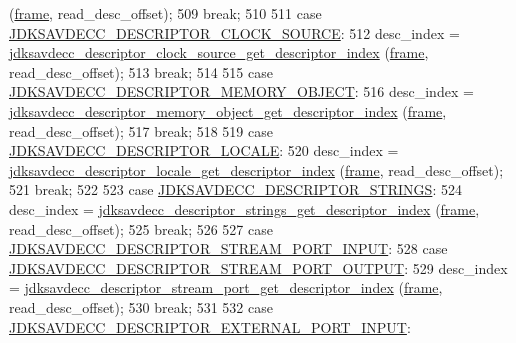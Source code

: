 \begin{DoxyCode}
      (\hyperlink{gst__avb__playbin_8c_ac8e710e0b5e994c0545d75d69868c6f0}{frame}, read\_desc\_offset);
509         \textcolor{keywordflow}{break};
510 
511     \textcolor{keywordflow}{case} \hyperlink{group__descriptor_gae8b9beae540ce53a6111a848a97ae748}{JDKSAVDECC\_DESCRIPTOR\_CLOCK\_SOURCE}:
512         desc\_index = \hyperlink{group__descriptor__clock__source_ga5b543a9b01054f53161de607189cacb7}{jdksavdecc\_descriptor\_clock\_source\_get\_descriptor\_index}
      (\hyperlink{gst__avb__playbin_8c_ac8e710e0b5e994c0545d75d69868c6f0}{frame}, read\_desc\_offset);
513         \textcolor{keywordflow}{break};
514 
515     \textcolor{keywordflow}{case} \hyperlink{group__descriptor_ga7d2dd5f18460db32b825ce78f19f8135}{JDKSAVDECC\_DESCRIPTOR\_MEMORY\_OBJECT}:
516         desc\_index = \hyperlink{group__descriptor__memory__object_ga1a5e3258584bf1095c4c5a59cb7f9da0}{jdksavdecc\_descriptor\_memory\_object\_get\_descriptor\_index}
      (\hyperlink{gst__avb__playbin_8c_ac8e710e0b5e994c0545d75d69868c6f0}{frame}, read\_desc\_offset);
517         \textcolor{keywordflow}{break};
518 
519     \textcolor{keywordflow}{case} \hyperlink{group__descriptor_ga5d552305c1813a87f014a434e974be4c}{JDKSAVDECC\_DESCRIPTOR\_LOCALE}:
520         desc\_index = \hyperlink{group__descriptor__locale_gacc9a6ca9fcae307381f586bbd4dae5ae}{jdksavdecc\_descriptor\_locale\_get\_descriptor\_index}
      (\hyperlink{gst__avb__playbin_8c_ac8e710e0b5e994c0545d75d69868c6f0}{frame}, read\_desc\_offset);
521         \textcolor{keywordflow}{break};
522 
523     \textcolor{keywordflow}{case} \hyperlink{group__descriptor_gaa93804189e6bcc937a95be69d6a6294b}{JDKSAVDECC\_DESCRIPTOR\_STRINGS}:
524         desc\_index = \hyperlink{group__descriptor__strings_ga4460bc1890e0e4f39f439389987cb515}{jdksavdecc\_descriptor\_strings\_get\_descriptor\_index}
      (\hyperlink{gst__avb__playbin_8c_ac8e710e0b5e994c0545d75d69868c6f0}{frame}, read\_desc\_offset);
525         \textcolor{keywordflow}{break};
526 
527     \textcolor{keywordflow}{case} \hyperlink{group__descriptor_gabf97c9389e49a8c27f2192854f830eda}{JDKSAVDECC\_DESCRIPTOR\_STREAM\_PORT\_INPUT}:
528     \textcolor{keywordflow}{case} \hyperlink{group__descriptor_gab28f87a9e7610f8441c1c4840d2c2fb9}{JDKSAVDECC\_DESCRIPTOR\_STREAM\_PORT\_OUTPUT}:
529         desc\_index = \hyperlink{group__descriptor__stream__port_ga7676ebd6ce26b6ef2d09bb93007f7c53}{jdksavdecc\_descriptor\_stream\_port\_get\_descriptor\_index}
      (\hyperlink{gst__avb__playbin_8c_ac8e710e0b5e994c0545d75d69868c6f0}{frame}, read\_desc\_offset);
530         \textcolor{keywordflow}{break};
531 
532     \textcolor{keywordflow}{case} \hyperlink{group__descriptor_ga20b1f1b3c8549b4607fa248c9df38c82}{JDKSAVDECC\_DESCRIPTOR\_EXTERNAL\_PORT\_INPUT}:

\end{DoxyCode}
